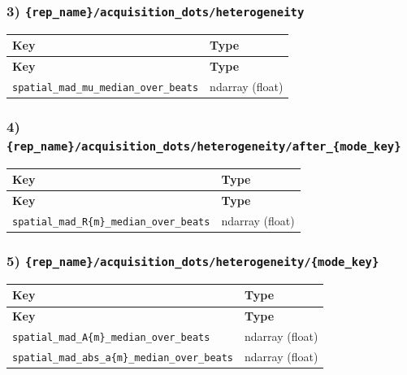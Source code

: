 \documentclass[11pt]{article}
\begin{document}
\subsubsection*{3) \texttt{\{rep\_\allowbreak{}name\}/\allowbreak{}acquisition\_\allowbreak{}dots/\allowbreak{}heterogeneity}}
\begin{longtable}{|p{}|p{}|}
\hline
\textbf{Key} & \textbf{Type} \\ \hline
\endfirsthead
\hline
\textbf{Key} & \textbf{Type} \\ \hline
\endhead
\texttt{spatial\_\allowbreak{}mad\_\allowbreak{}mu\_\allowbreak{}median\_\allowbreak{}over\_\allowbreak{}beats} & ndarray (float) \\ \hline
\end{longtable}

\subsubsection*{4) \texttt{\{rep\_\allowbreak{}name\}/\allowbreak{}acquisition\_\allowbreak{}dots/\allowbreak{}heterogeneity/\allowbreak{}after\_\allowbreak{}\{mode\_\allowbreak{}key\}}}
\begin{longtable}{|p{}|p{}|}
\hline
\textbf{Key} & \textbf{Type} \\ \hline
\endfirsthead
\hline
\textbf{Key} & \textbf{Type} \\ \hline
\endhead
\texttt{spatial\_\allowbreak{}mad\_\allowbreak{}R\{m\}\_\allowbreak{}median\_\allowbreak{}over\_\allowbreak{}beats} & ndarray (float) \\ \hline
\end{longtable}

\subsubsection*{5) \texttt{\{rep\_\allowbreak{}name\}/\allowbreak{}acquisition\_\allowbreak{}dots/\allowbreak{}heterogeneity/\allowbreak{}\{mode\_\allowbreak{}key\}}}
\begin{longtable}{|p{}|p{}|}
\hline
\textbf{Key} & \textbf{Type} \\ \hline
\endfirsthead
\hline
\textbf{Key} & \textbf{Type} \\ \hline
\endhead
\texttt{spatial\_\allowbreak{}mad\_\allowbreak{}A\{m\}\_\allowbreak{}median\_\allowbreak{}over\_\allowbreak{}beats} & ndarray (float) \\ \hline
\texttt{spatial\_\allowbreak{}mad\_\allowbreak{}abs\_\allowbreak{}a\{m\}\_\allowbreak{}median\_\allowbreak{}over\_\allowbreak{}beats} & ndarray (float) \\ \hline
\end{longtable}
\end{document}
